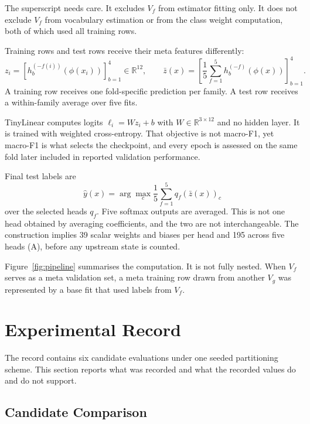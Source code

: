 \documentclass[runningheads]{llncs}
\begin{document}
The superscript needs care. It excludes $V_f$ from estimator fitting only. It does not exclude $V_f$ from vocabulary estimation or from the class weight computation, both of which used all training rows.

Training rows and test rows receive their meta features differently:
\begin{equation}
z_i = \left[h^{(-f(i))}_b(\phi(x_i))\right]^4_{b=1} \in \mathbb{R}^{12},
\qquad
\bar{z}(x) = \left[\frac{1}{5}\sum_{f=1}^{5} h^{(-f)}_b(\phi(x))\right]^4_{b=1}.
\end{equation}
A training row receives one fold-specific prediction per family. A test row receives a within-family average over five fits.

TinyLinear computes logits $\ell_i = W z_i + b$ with $W \in \mathbb{R}^{3 \times 12}$ and no hidden layer. It is trained with weighted cross-entropy. That objective is not macro-F1, yet macro-F1 is what selects the checkpoint, and every epoch is assessed on the same fold later included in reported validation performance.

Final test labels are
\begin{equation}
\hat{y}(x) = \arg\max_c \frac{1}{5}\sum_{f=1}^{5} q_f(\bar{z}(x))_c
\end{equation}
over the selected heads $q_f$. Five softmax outputs are averaged. This is not one head obtained by averaging coefficients, and the two are not interchangeable. The construction implies 39 scalar weights and biases per head and 195 across five heads (A), before any upstream state is counted.

Figure~\ref{fig:pipeline} summarises the computation. It is not fully nested. When $V_f$ serves as a meta validation set, a meta training row drawn from another $V_g$ was represented by a base fit that used labels from $V_f$.






\section{Experimental Record}
\label{sec:record}

The record contains six candidate evaluations under one seeded partitioning scheme. This section reports what was recorded and what the recorded values do and do not support.

\subsection{Candidate Comparison}
\end{document}
